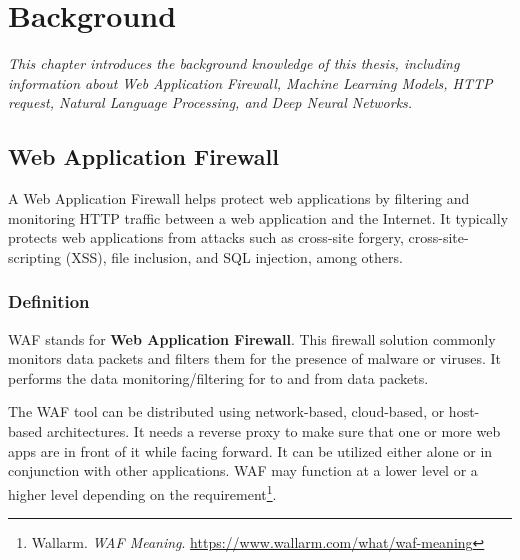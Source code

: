 \chapter{Background}
\label{chap:background}
\textit{\hspace{0.5cm}This chapter introduces the background knowledge of this thesis, including information about Web Application Firewall, Machine Learning Models, HTTP request, Natural Language Processing, and Deep Neural Networks.}
\minitoc

\section{Web Application Firewall} 
\label{sec:waf}
\hspace{0.5cm}A Web Application Firewall helps protect web applications by filtering and monitoring HTTP traffic between a web application and the Internet. It typically protects web applications from attacks such as cross-site forgery, cross-site-scripting (XSS), file inclusion, and SQL injection, among others. 
\subsection{Definition}
\label{subsec:waf_def}
\hspace{0.5cm}WAF stands for \textbf{Web Application Firewall}. This firewall solution commonly monitors data packets and filters them for the presence of malware or viruses. It performs the data monitoring/filtering for to and from data packets.  

The WAF tool can be distributed using network-based, cloud-based, or host-based architectures. It needs a reverse proxy to make sure that one or more web apps are in front of it while facing forward. It can be utilized either alone or in conjunction with other applications. WAF may function at a lower level or a higher level depending on the requirement\footnote{\label{wallarm} Wallarm. \textit{WAF Meaning}. \url{https://www.wallarm.com/what/waf-meaning}}.


